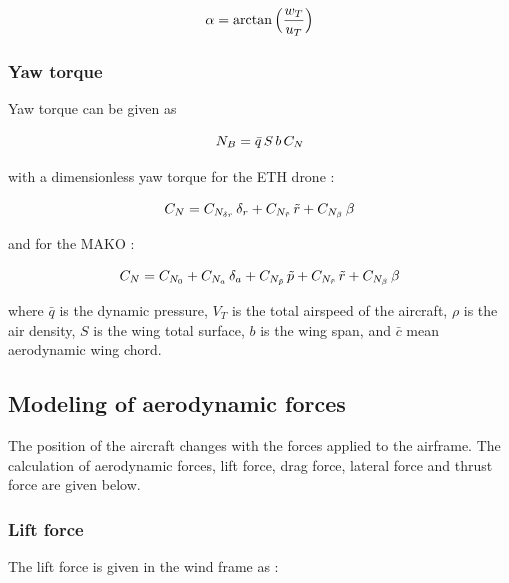 \begin{equation}{\label{eqn:angleOfAttack}}
\alpha = \arctan{\Big( \frac{w_T}{u_T} \Big)}
\end{equation}

\subsubsection{Yaw torque}

Yaw torque can be given as

\begin{equation}{\label{eqn:yawTorque}}
N_B = \bar{q} \, S \, b \, C_N \\
\end{equation}

with a dimensionless yaw torque for the ETH drone : 

\begin{equation}{\label{eqn:bigCraftC_N}}
C_N= C_{N_{\delta r}} \, \delta_{r} + C_{N_{\tilde{r}}} \, \tilde{r} +  C_{N_\beta} \, \beta 
\end{equation}

and for the MAKO :

\begin{equation}{\label{eqn:makoC_N}}
C_N= C_{N_{0}} + C_{N_{a}} \, \delta_{a} + C_{N_{\tilde{p}}} \, \tilde{p} + C_{N_{\tilde{r}}} \, \tilde{r} +  C_{N_\beta} \, \beta 
\end{equation}

where $\bar{q}$ is the dynamic pressure, $V_T$ is the total airspeed of the aircraft, $\rho$ is the air density, $S$ is the wing total surface, $b$ is the wing span, and $\bar{c}$ mean aerodynamic wing chord. 


\subsection{Modeling of aerodynamic forces}

The position of the aircraft changes with the forces applied to the airframe. The calculation of aerodynamic forces, lift force, drag force, lateral force and thrust force are given below.


\subsubsection{Lift force}

The lift force is given in the wind frame as : 

